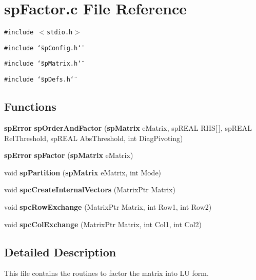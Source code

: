 \section{sp\-Factor.c File Reference}
\label{spFactor_8c}
{\tt \#include $<$stdio.h$>$}\par
{\tt \#include \char`\"{}sp\-Config.h\char`\"{}}\par
{\tt \#include \char`\"{}sp\-Matrix.h\char`\"{}}\par
{\tt \#include \char`\"{}sp\-Defs.h\char`\"{}}\par
\subsection*{Functions}
\begin{CompactItemize}
\item 
{\bf sp\-Error} {\bf sp\-Order\-And\-Factor} ({\bf sp\-Matrix} e\-Matrix, sp\-REAL RHS[$\,$], sp\-REAL Rel\-Threshold, sp\-REAL Abs\-Threshold, int Diag\-Pivoting)
\item 
{\bf sp\-Error} {\bf sp\-Factor} ({\bf sp\-Matrix} e\-Matrix)
\item 
void {\bf sp\-Partition} ({\bf sp\-Matrix} e\-Matrix, int Mode)
\item 
{}
void {\bf spc\-Create\-Internal\-Vectors} (Matrix\-Ptr Matrix)\label{spFactor_8c_a27}

\item 
{}
void {\bf spc\-Row\-Exchange} (Matrix\-Ptr Matrix, int Row1, int Row2)\label{spFactor_8c_a34}

\item 
{}
void {\bf spc\-Col\-Exchange} (Matrix\-Ptr Matrix, int Col1, int Col2)\label{spFactor_8c_a35}

\end{CompactItemize}


\subsection{Detailed Description}
 This file contains the routines to factor the matrix into LU form.

